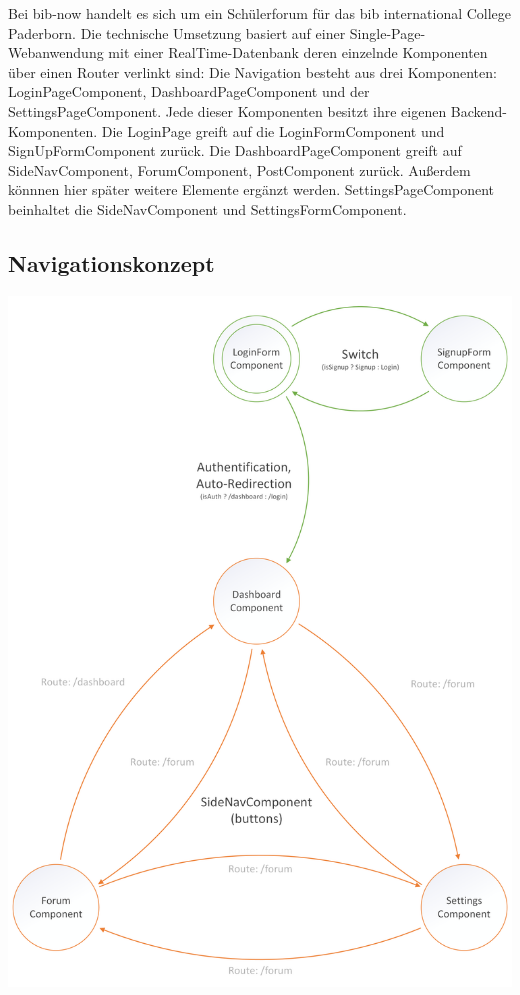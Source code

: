 \documentclass[12pt,titlepage]{article}
\begin{document}
\vspace{2cm}

Bei bib-now handelt es sich um ein Schülerforum für das bib international College Paderborn. Die technische Umsetzung basiert auf  einer Single-Page-Webanwendung mit einer RealTime-Datenbank deren einzelnde Komponenten über einen Router verlinkt sind: Die Navigation besteht aus drei Komponenten: LoginPageComponent, DashboardPageComponent und der SettingsPageComponent. Jede dieser Komponenten besitzt ihre eigenen Backend-Komponenten. Die LoginPage greift auf die LoginFormComponent und SignUpFormComponent zurück. Die DashboardPageComponent greift auf  SideNavComponent, ForumComponent, PostComponent zurück. Außerdem könnnen hier später weitere Elemente ergänzt werden. SettingsPageComponent beinhaltet die SideNavComponent und SettingsFormComponent. 


\pagebreak

\subsection{Navigationskonzept}

\vspace{2cm}

\includegraphics [width=400pt]{Konzepte/bibnow_Navigationskonzept}
\end{document}
